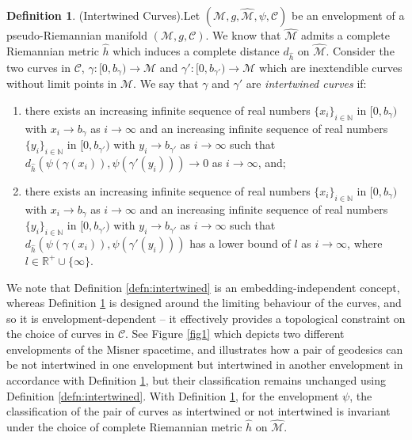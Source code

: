\documentclass[pdflatex,sn-mathphys-num]{sn-jnl}
\theoremstyle{definition}
\newtheorem{defn}[theorem]{Definition}
\begin{document}
\begin{defn}(Intertwined Curves).\label{defn:Sintertwined}
    Let $(\mathcal{M},g,\hat{\mathcal{M}},\psi,\mathcal{C})$ be an envelopment of a pseudo-Riemannian manifold  $(\mathcal{M},g,\mathcal{C})$. We know that $\hat{\mathcal{M}}$ admits a complete Riemannian metric $\hat{h}$ which induces a complete distance $d_{\hat{h}}$ on $\hat{\mathcal{M}}$. Consider the two curves in $\mathcal{C}$, $\gamma:[0,b_{\gamma}) \rightarrow \mathcal{M}$ and $\gamma':[0,b_{\gamma'}) \rightarrow \mathcal{M}$ which are inextendible curves without limit points in $\mathcal{M}$. We say that $\gamma$ and $\gamma'$ are {\it intertwined curves} if:
    \begin{enumerate}
        \item there exists an increasing infinite sequence of real numbers $\{x_i\}_{i \in \mathbb{N}}$ in $[0,b_{\gamma})$ with $x_i \rightarrow b_{\gamma}$ as $i \rightarrow \infty$ and an increasing infinite sequence of real numbers $\{y_i\}_{i \in \mathbb{N}}$ in $[0,b_{\gamma'})$ with $y_i \rightarrow b_{\gamma'}$ as $i \rightarrow \infty$ such that $d_{\hat{h}}(\psi(\gamma(x_i)),\psi(\gamma'(y_i))) \rightarrow 0$ as $i \rightarrow \infty$, and;
        \item there exists an increasing infinite sequence of real numbers $\{x_i\}_{i \in \mathbb{N}}$ in $[0,b_{\gamma})$ with $x_i \rightarrow b_{\gamma}$ as $i \rightarrow \infty$ and an increasing infinite sequence of real numbers $\{y_i\}_{i \in \mathbb{N}}$ in $[0,b_{\gamma'})$ with $y_i \rightarrow b_{\gamma'}$ as $i \rightarrow \infty$ such that $d_{\hat{h}}(\psi(\gamma(x_i)),\psi(\gamma'(y_i)))$ has a lower bound of $l$ as $i \rightarrow \infty$, where $l \in \mathbb{R}^+ \cup \{\infty\}$.
    \end{enumerate}
\end{defn}

We note that Definition \ref{defn:intertwined} is an embedding-independent concept, whereas Definition \ref{defn:Sintertwined} is designed around the limiting behaviour of the curves, and so it is envelopment-dependent -- it effectively provides a topological constraint on the choice of curves in $\mathcal{C}$. See Figure \ref{fig1} which depicts two different envelopments of the Misner spacetime, and illustrates how a pair of geodesics can be not intertwined in one envelopment but intertwined in another envelopment in accordance with Definition \ref{defn:Sintertwined}, but their classification remains unchanged using Definition \ref{defn:intertwined}. With Definition \ref{defn:Sintertwined}, for the envelopment $\psi$, the classification of the pair of curves as intertwined or not intertwined is invariant under the choice of complete Riemannian metric $\hat{h}$ on $\hat{\mathcal{M}}$.\\
\end{document}
